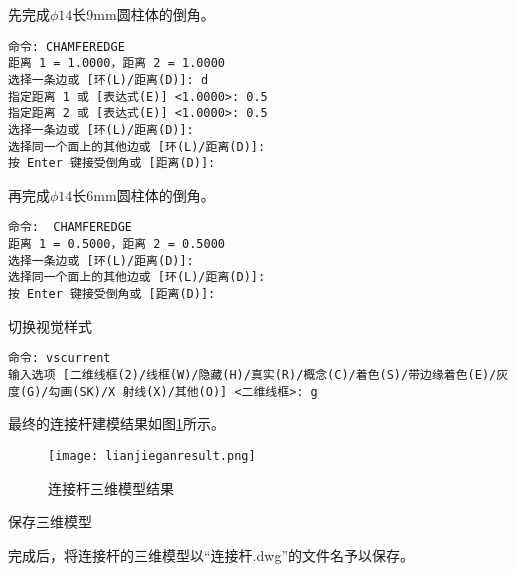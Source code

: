 \begin{procedure}
先完成$\phi 14$长9mm圆柱体的倒角。
\begin{lstlisting}
命令: CHAMFEREDGE
距离 1 = 1.0000，距离 2 = 1.0000
选择一条边或 [环(L)/距离(D)]: d
指定距离 1 或 [表达式(E)] <1.0000>: 0.5
指定距离 2 或 [表达式(E)] <1.0000>: 0.5
选择一条边或 [环(L)/距离(D)]:
选择同一个面上的其他边或 [环(L)/距离(D)]:
按 Enter 键接受倒角或 [距离(D)]:
\end{lstlisting}
再完成$\phi 14$长6mm圆柱体的倒角。
\begin{lstlisting}
命令:  CHAMFEREDGE
距离 1 = 0.5000，距离 2 = 0.5000
选择一条边或 [环(L)/距离(D)]:
选择同一个面上的其他边或 [环(L)/距离(D)]:
按 Enter 键接受倒角或 [距离(D)]:
\end{lstlisting}
\item 切换视觉样式
\begin{lstlisting}
命令: vscurrent
输入选项 [二维线框(2)/线框(W)/隐藏(H)/真实(R)/概念(C)/着色(S)/带边缘着色(E)/灰度(G)/勾画(SK)/X 射线(X)/其他(O)] <二维线框>: g
\end{lstlisting}

最终的连接杆建模结果如图\ref{fig:lianjieganresult}所示。
\begin{figure}[htbp]
\centering
\texttt{[image: lianjieganresult.png]}
\caption{连接杆三维模型结果}\label{fig:lianjieganresult}
\end{figure}

\item 保存三维模型

完成后，将连接杆的三维模型以“连接杆.dwg”的文件名予以保存。
\end{procedure}
\endinput